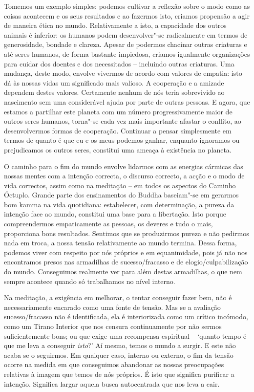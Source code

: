 Tomemos um exemplo simples: podemos cultivar a reflexão sobre o modo como as coisas acontecem e os seus resultados e ao fazermos isto, criamos propensão a agir de maneira ética no mundo. Relativamente a isto, a capacidade dos outros animais é inferior: os humanos podem desenvolver"-se radicalmente em termos de generosidade, bondade e clareza. Apesar de podermos chacinar outras criaturas e até seres humanos, de forma bastante impiedosa, criamos igualmente organizações para cuidar dos doentes e dos necessitados -- incluindo outras criaturas. Uma mudança, deste modo, envolve vivermos de acordo com valores de empatia: isto dá às nossas vidas um significado mais valioso. A cooperação e a amizade dependem destes valores. Certamente nenhum de nós teria sobrevivido ao nascimento sem uma considerável ajuda por parte de outras pessoas. E agora, que estamos a partilhar este planeta com um número progressivamente maior de outros seres humanos, torna"-se cada vez mais importante afastar o conflito, ao desenvolvermos formas de cooperação. Continuar a pensar simplesmente em termos de quanto é que eu e os meus podemos ganhar, enquanto ignoramos ou prejudicamos os outros seres, constitui uma ameaça à existência no planeta.

O caminho para o fim do mundo envolve lidarmos com as energias cármicas das nossas mentes com a intenção correcta, o discurso correcto, a acção e o modo de vida correctos, assim como na meditação -- em todos os aspectos do Caminho Óctuplo. Grande parte dos ensinamentos do Buddha baseiam"-se em gerarmos bom kamma na vida quotidiana: estabelecer, com determinação, a pureza da intenção face ao mundo, constitui uma base para a libertação. Isto porque compreendermos empaticamente as pessoas, os deveres e tudo o mais, proporciona bons resultados. Sentimos que se produzirmos pureza e não pedirmos nada em troca, a nossa tensão relativamente ao mundo termina. Dessa forma, podemos viver com respeito por nós próprios e em equanimidade, pois já não nos encontramos presos nas armadilhas de sucesso/fracasso e de elogio/culpabilização do mundo. Conseguimos realmente ver para além destas armadilhas, o que nem sempre acontece quando só trabalhamos no nível interno.

Na meditação, a exigência em melhorar, o tentar conseguir fazer bem, não é necessariamente encarado como uma fonte de tensão. Mas se a avaliação sucesso/fracasso não é identificada, ela é interiorizada como um crítico incómodo, como um Tirano Interior que nos censura continuamente por não sermos suficientemente bons; ou que exige uma recompensa espiritual -- `quanto tempo é que me leva a conseguir \emph{isto}?' Aí mesmo, temos o mundo a surgir. E este não acaba se o seguirmos. Em qualquer caso, interno ou externo, o fim da tensão ocorre na medida em que conseguimos abandonar as nossas preocupações relativas à imagem que temos de nós próprios. É isto que significa purificar a intenção. Significa largar aquela busca autocentrada que nos leva a cair.

